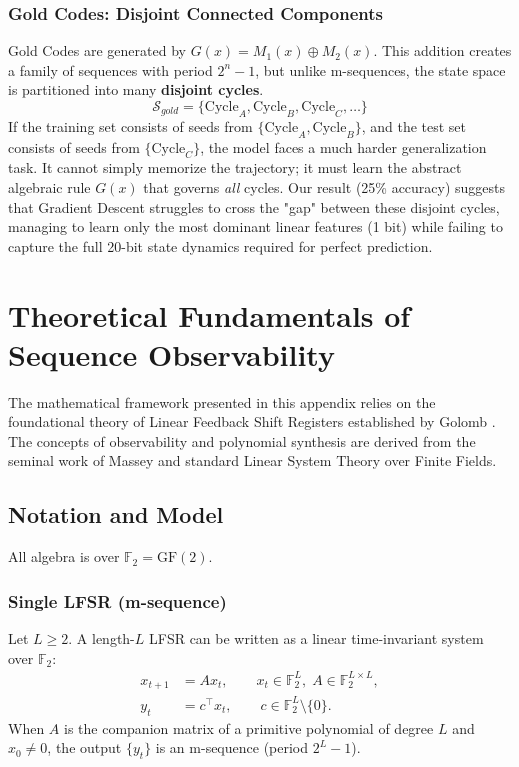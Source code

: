 \documentclass[12pt,a4paper]{report}
\newcommand{\F}{\mathbb{F}}
\newcommand{\GF}{\mathrm{GF}}
\theoremstyle{plain}
\begin{document}
\subsection{Gold Codes: Disjoint Connected Components}
Gold Codes are generated by $G(x) = M_1(x) \oplus M_2(x)$. This addition creates a family of sequences with period $2^n - 1$, but unlike m-sequences, the state space is partitioned into many \textbf{disjoint cycles}.
\begin{equation}
    \mathcal{S}_{gold} = \{ \text{Cycle}_A, \text{Cycle}_B, \text{Cycle}_C, \dots \}
\end{equation}
If the training set consists of seeds from $\{ \text{Cycle}_A, \text{Cycle}_B \}$, and the test set consists of seeds from $\{ \text{Cycle}_C \}$, the model faces a much harder generalization task. It cannot simply memorize the trajectory; it must learn the abstract algebraic rule $G(x)$ that governs \textit{all} cycles.
Our result (25\% accuracy) suggests that Gradient Descent struggles to cross the "gap" between these disjoint cycles, managing to learn only the most dominant linear features (1 bit) while failing to capture the full 20-bit state dynamics required for perfect prediction.

\chapter{Theoretical Fundamentals of Sequence Observability} \label{app:B}
The mathematical framework presented in this appendix relies on the foundational theory of Linear Feedback Shift Registers established by Golomb \cite{golomb}. The concepts of observability and polynomial synthesis are derived from the seminal work of Massey \cite{massey} and standard Linear System Theory over Finite Fields.

\section{Notation and Model}

All algebra is over $\F_2=\GF(2)$.

\subsection{Single LFSR (m-sequence)}
Let $L\ge 2$. A length-$L$ LFSR can be written as a linear time-invariant system over $\F_2$:
\begin{align}
x_{t+1} &= A x_t,\qquad x_t\in \F_2^L,\; A\in \F_2^{L\times L}, \label{eq:lfsr_state}\\
y_t &= c^\top x_t,\qquad c\in \F_2^L\setminus\{0\}. \label{eq:lfsr_output}
\end{align}
When $A$ is the companion matrix of a primitive polynomial of degree $L$ and $x_0\neq 0$,
the output $\{y_t\}$ is an m-sequence (period $2^L-1$).
\end{document}
